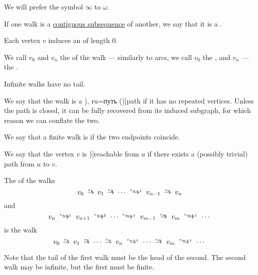 \begin{definition}
\begin{thmenum}[resume=def:graph_walk]
    We will prefer the symbol \( \infty \) to \( \omega \).

     If one walk is a \hyperref[def:contiguous_subsequence]{contiguous subsequence} of another, we say that it is a .

     Each vertex \( v \) induces an  of length \( 0 \).

     We call \( v_0 \) and \( v_n \) the  of the walk --- similarly to arcs, we call \( v_0 \) the , and \( v_n \) --- the .

    Infinite walks have no tail.

     We say that the walk is a \term[bg=път (\cite[11]{Мирчев2001}), ru=путь (\cite[278]{БелоусовТкачёв2004})]{path} if it has no repeated vertices. Unless the path is closed, it can be fully recovered from its induced subgraph, for which reason we can conflate the two.

     We say that a finite walk is  if the two endpoints coincide.

     We say that the vertex \( v \) is \term[ru=достижимая (вершина) (\cite[278]{БелоусовТкачёв2004})]{reachable} from \( u \) if there exists a (possibly trivial) path from \( u \) to \( v \).

     The  of the walks
    \begin{equation*}
      v_0 \reloset {e_1} \to v_1 \reloset {e_2} \to \cdots \reloset {e_{n-1}} \to v_{n-1} \reloset {e_n} \to v_n
    \end{equation*}
    and
    \begin{equation*}
      v_n \reloset {e_{n+1}} \to v_{n+1} \reloset {e_{n+2}} \to \cdots \reloset {e_{m-1}} \to v_{m-1} \reloset {e_m} \to v_m \reloset {e_{m+1}} \to \cdots
    \end{equation*}
    is the walk
    \begin{equation*}
      v_0 \reloset {e_1} \to v_1 \reloset {e_2} \to \cdots \reloset {e_n} \to v_n \reloset {e_{n+1}} \to \cdots \reloset {e_m} \to v_m  \reloset {e_{m+1}} \to \cdots
    \end{equation*}

    Note that the tail of the first walk must be the head of the second. The second walk may be infinite, but the first must be finite.
  \end{thmenum}
\end{definition}
